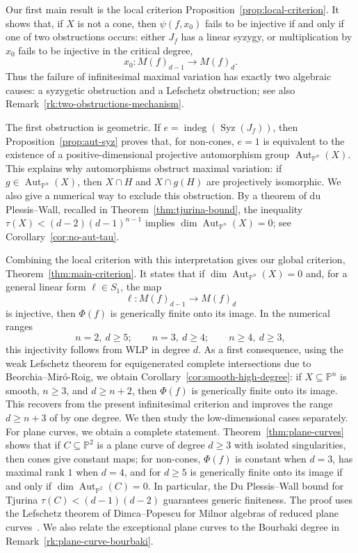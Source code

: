 \documentclass[11pt]{amsart}
\theoremstyle{plain}
\theoremstyle{definition}
\numberwithin{equation}{section}
\newcommand{\PP}{\mathbb{P}}
\DeclareMathOperator{\Aut}{Aut}
\begin{document}
Our first main result is the local criterion
Proposition~\ref{prop:local-criterion}. It shows that, if $X$ is not a cone, then $\psi(f,x_0)$ fails to be injective if and only if one of two obstructions
occurs: either $J_f$ has a linear syzygy, or multiplication by $x_0$ fails to be
injective in the critical degree,
\[
x_0:M(f)_{d-1}\to M(f)_d.
\]
Thus the failure of infinitesimal maximal variation has exactly two algebraic causes: a syzygetic obstruction and a Lefschetz obstruction; see also
Remark~\ref{rk:two-obstructions-mechanism}.

The first obstruction is geometric. If
$e=\operatorname{indeg}(\operatorname{Syz}(J_f))$, then Proposition~\ref{prop:aut-syz} proves that, for non-cones, $e=1$ is equivalent to the existence of a positive-dimensional projective automorphism group
$\Aut_{\PP^n}(X)$. This explains why automorphisms obstruct maximal variation: if $g\in\Aut_{\PP^n}(X)$, then $X\cap H$ and $X\cap g(H)$ are projectively
isomorphic. We also give a numerical way to exclude this obstruction. By a theorem of du Plessis--Wall, recalled in Theorem~\ref{thm:tjurina-bound}, the
inequality  $\tau(X)<(d-2)(d-1)^{n-1}$
implies $\dim\Aut_{\PP^n}(X)=0$; see Corollary~\ref{cor:no-aut-tau}.

Combining the local criterion with this interpretation gives our global criterion, Theorem~\ref{thm:main-criterion}. It states that if
$\dim\Aut_{\PP^n}(X)=0$ and, for a general linear form $\ell\in S_1$, the map
\[
\ell:M(f)_{d-1}\to M(f)_d
\]
is injective, then $\Phi(f)$ is generically finite onto its image. In the numerical ranges
\[
n=2,\ d\geq5;\qquad n=3,\ d\geq4;\qquad n\geq4,\ d\geq3,
\]
this injectivity follows from WLP in degree $d$. As a first consequence, using the weak Lefschetz theorem for equigenerated complete intersections due to
Beorchia--Mir\'o-Roig, we obtain Corollary~\ref{cor:smooth-high-degree}: if
$X\subseteq\PP^n$ is smooth, $n\geq3$, and $d\geq n+2$, then $\Phi(f)$ is generically finite onto its image. 
 This recovers \cite[Corollary~4.7]{BM} from the present infinitesimal criterion
and improves the range $d\geq n+3$ of \cite[Theorem~1.3]{PRT} by one degree. We then study the low-dimensional cases separately. For plane curves, we obtain a complete statement. Theorem~\ref{thm:plane-curves} shows that if
$C\subseteq\PP^2$ is a plane curve of degree $d\geq3$ with isolated singularities, then cones give constant maps; for non-cones, $\Phi(f)$ is
constant when $d=3$, has maximal rank $1$ when $d=4$, and for $d\geq5$ is generically finite onto its image if and only if $\dim\Aut_{\PP^2}(C)=0$. In particular, the Du Plessis--Wall bound for Tjurina 
$\tau(C)<(d-1)(d-2)$ guarantees generic finiteness. The proof uses the Lefschetz theorem of Dimca--Popescu for Milnor algebras of reduced plane curves~\cite[Corollary~4.4]{DPop}.
We also relate the exceptional plane curves to the Bourbaki degree in Remark~\ref{rk:plane-curve-bourbaki}.
\end{document}
